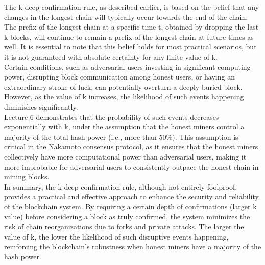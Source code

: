 The k-deep confirmation rule, as described earlier, is based on the belief that any changes in the longest chain will typically occur towards the end of the chain. The prefix of the longest chain at a specific time t, obtained by dropping the last k blocks, will continue to remain a prefix of the longest chain at future times as well. It is essential to note that this belief holds for most practical scenarios, but it is not guaranteed with absolute certainty for any finite value of k.\\
Certain conditions, such as adversarial users investing in significant computing power, disrupting block communication among honest users, or having an extraordinary stroke of luck, can potentially overturn a deeply buried block. However, as the value of k increases, the likelihood of such events happening diminishes significantly.\\
Lecture 6 demonstrates that the probability of such events decreases exponentially with k, under the assumption that the honest miners control a majority of the total hash power (i.e., more than 50\%). This assumption is critical in the Nakamoto consensus protocol, as it ensures that the honest miners collectively have more computational power than adversarial users, making it more improbable for adversarial users to consistently outpace the honest chain in mining blocks.\\
In summary, the k-deep confirmation rule, although not entirely foolproof, provides a practical and effective approach to enhance the security and reliability of the blockchain system. By requiring a certain depth of confirmations (larger k value) before considering a block as truly confirmed, the system minimizes the risk of chain reorganizations due to forks and private attacks. The larger the value of k, the lower the likelihood of such disruptive events happening, reinforcing the blockchain's robustness when honest miners have a majority of the hash power.\\
